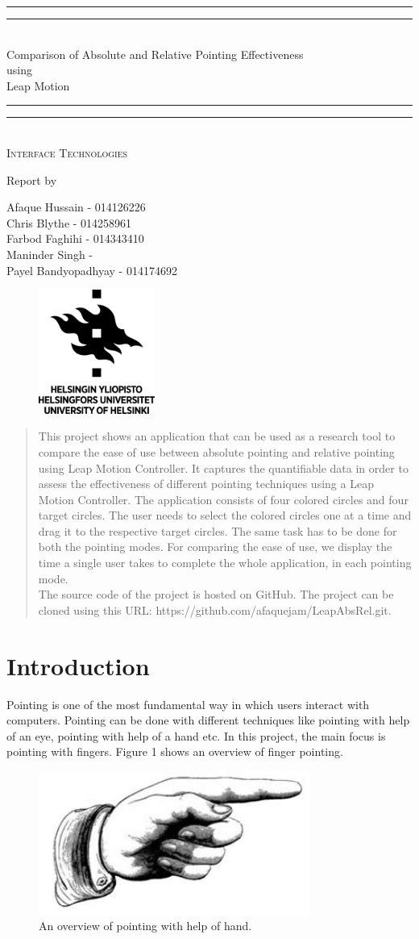 \documentclass[titlepage]{article}
\newcommand*{\plogo}{\fbox{$\mathcal{UH}$}} %
\newcommand*{\titleGP}{\begingroup %
\centering %
\vspace*{\baselineskip} %

\rule{\textwidth}{1.6pt}\vspace*{-\baselineskip}\vspace*{2pt} %
\rule{\textwidth}{0.4pt}\\[\baselineskip] %

{\LARGE Comparison of Absolute and Relative Pointing Effectiveness \\ using \\[0.3\baselineskip] Leap Motion}\\[0.2\baselineskip] %

\rule{\textwidth}{0.4pt}\vspace*{-\baselineskip}\vspace{3.2pt} %
\rule{\textwidth}{1.6pt}\\[\baselineskip] %

\scshape %
Interface Technologies \\ %

\vspace*{2\baselineskip} %

Report by \\[\baselineskip]
{\Large Afaque Hussain - 014126226 \\ Chris Blythe - 014258961 \\ Farbod Faghihi - 014343410  \\ Maninder Singh - \\ Payel Bandyopadhyay - 014174692 \par} %

\vfill %

\begin{figure}[!h]
\centering
\includegraphics[width=1.5in]{Logo_UH}
\end{figure}

\endgroup}
\begin{document}
\pagestyle {empty}
\titleGP
\clearpage

\vspace{\fill}
\begin{abstract}
This project shows an application that can be used as a research tool to compare the ease of use between absolute pointing and relative pointing using Leap Motion Controller. It captures the quantifiable data in order to assess the effectiveness of different pointing techniques using a Leap Motion Controller. The application consists of four colored circles and four target circles. The user needs to select the colored circles one at a time and drag it to the respective target circles. The same task has to be done for both the pointing modes. For comparing the ease of use, we display the time a single user takes to complete the whole application, in each pointing mode. \\

The source code of the project is hosted on GitHub. The project can be cloned using this URL: https://github.com/afaquejam/LeapAbsRel.git.  
\end{abstract}
\vspace{\fill}
\clearpage

\section{Introduction}
Pointing is one of the most fundamental way in which users interact with computers. Pointing can be done with different techniques like pointing with help of an eye, pointing with help of a hand etc. In this project, the main focus is pointing with fingers. Figure 1 shows an overview of finger pointing.

\begin{figure}[!h]
\centering
\includegraphics[width=3.5in]{Figure_1}
\caption{An overview of pointing with help of hand.}
\end{figure}
\end{document}
